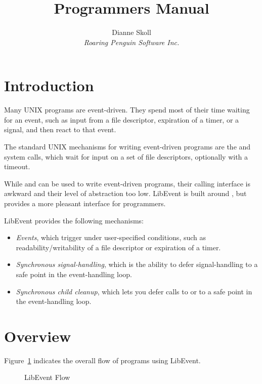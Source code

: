 \documentclass{article}
\title{\Le{} Programmers Manual}
\author{Dianne Skoll\\\textit{Roaring Penguin Software Inc.}}
\newcommand{\Le}{\textsf{LibEvent}}
\begin{document}
\maketitle

\section{Introduction}
\label{sec:introduction}

Many UNIX programs are event-driven.  They spend most of their time
waiting for an event, such as input from a file descriptor, expiration
of a timer, or a signal, and then react to that event.

The standard UNIX mechanisms for writing event-driven programs are
the  and  system calls, which wait for input
on a set of file descriptors, optionally with a timeout.

While  and  can be used to write event-driven
programs, their calling interface is awkward and their level of
abstraction too low.  \Le{} is built around , but
provides a more pleasant interface for programmers.

\Le{} provides the following mechanisms:
\begin{itemize}
\item \textit{Events}, which trigger under user-specified conditions,
  such as readability/writability of a file descriptor or expiration of
  a timer.
\item \textit{Synchronous signal-handling}, which is the ability to
  defer signal-handling to a safe point in the event-handling loop.
\item \textit{Synchronous child cleanup}, which lets you defer calls
  to  or  to a safe point in the event-handling
  loop.
\end{itemize}

\section{Overview}
\label{sec:overview}

Figure~\ref{fig:flow} indicates the overall flow of programs using
\Le{}.
\begin{figure}[htbp]
  \begin{center}
    \caption{\Le{} Flow}
    \label{fig:flow}
  \end{center}
\end{figure}
\end{document}
